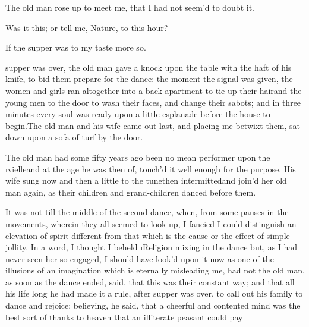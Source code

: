 \documentclass[twoside]{article}
\begin{document}
The old man rose up to meet me,\break
{}
that I had not seem’d to doubt it.


Was it this; or tell me, Nature,\break
{}
to this hour?

If the supper was to my taste\tskk\break
{}
more so.





\vskip 6pt


 supper was over, the old
man gave a knock upon the table with the
haft of his knife, to bid them prepare for
the dance: the moment the signal was
given, the women and girls ran altogether
into a back apartment to tie up their
hair\tskk and the young men to the door
to wash their faces, and change their
sabots; and in three minutes every soul
was ready upon a little esplanade before
the house to begin.\tskk The old man and
his wife came out last, and placing me
betwixt them, sat down upon a sofa of turf
by the door.

The old man had some fifty years ago been
no mean performer upon the
\i{vielle}\tskk and at the age he was
then of, touch’d it well enough for the
purpose.  His wife sung now and then a
little to the tune\tskk then
intermitted\tskk and join’d her old man
again, as their children and
grand-children danced before them.

It was not till the middle of the second
dance, when, from some pauses in the
movements, wherein they all seemed to look
up, I fancied I could distinguish an
elevation of spirit different from that
which is the cause or the effect of simple
jollity.  In a word, I thought I beheld
\i{Religion} mixing in the dance\tskk
but, as I had never seen her so engaged, I
should have look’d upon it now as one of
the illusions of an imagination which is
eternally misleading me, had not the old
man, as soon as the dance ended, said,
that this was their constant way; and that
all his life long he had made it a rule,
after supper was over, to call out his
family to dance and rejoice; believing, he
said, that a cheerful and contented mind
was the best sort of thanks to heaven that
an illiterate peasant could pay\tskk 
\end{document}
